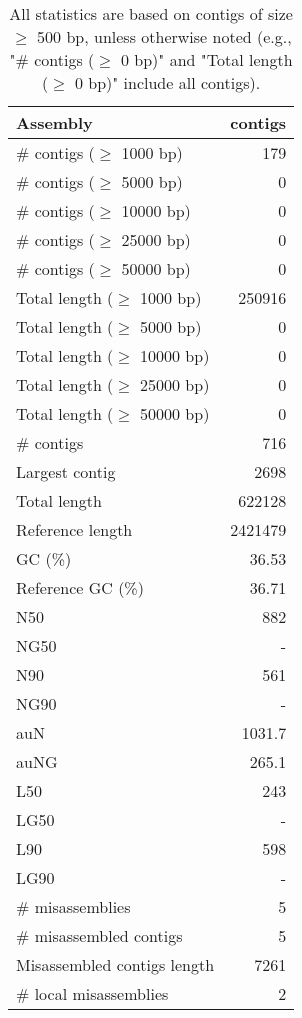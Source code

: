 \documentclass[12pt,a4paper]{article}
\begin{document}
\begin{table}[ht]
\begin{center}
\caption{All statistics are based on contigs of size $\geq$ 500 bp, unless otherwise noted (e.g., "\# contigs ($\geq$ 0 bp)" and "Total length ($\geq$ 0 bp)" include all contigs).}
\begin{tabular}{|l*{1}{|r}|}
\hline
Assembly & contigs \\ \hline
\# contigs ($\geq$ 1000 bp) & 179 \\ \hline
\# contigs ($\geq$ 5000 bp) & 0 \\ \hline
\# contigs ($\geq$ 10000 bp) & 0 \\ \hline
\# contigs ($\geq$ 25000 bp) & 0 \\ \hline
\# contigs ($\geq$ 50000 bp) & 0 \\ \hline
Total length ($\geq$ 1000 bp) & 250916 \\ \hline
Total length ($\geq$ 5000 bp) & 0 \\ \hline
Total length ($\geq$ 10000 bp) & 0 \\ \hline
Total length ($\geq$ 25000 bp) & 0 \\ \hline
Total length ($\geq$ 50000 bp) & 0 \\ \hline
\# contigs & 716 \\ \hline
Largest contig & 2698 \\ \hline
Total length & 622128 \\ \hline
Reference length & 2421479 \\ \hline
GC (\%) & 36.53 \\ \hline
Reference GC (\%) & 36.71 \\ \hline
N50 & 882 \\ \hline
NG50 & - \\ \hline
N90 & 561 \\ \hline
NG90 & - \\ \hline
auN & 1031.7 \\ \hline
auNG & 265.1 \\ \hline
L50 & 243 \\ \hline
LG50 & - \\ \hline
L90 & 598 \\ \hline
LG90 & - \\ \hline
\# misassemblies & 5 \\ \hline
\# misassembled contigs & 5 \\ \hline
Misassembled contigs length & 7261 \\ \hline
\# local misassemblies & 2 \\ \hline

\end{tabular}
\end{center}
\end{table}
\end{document}
